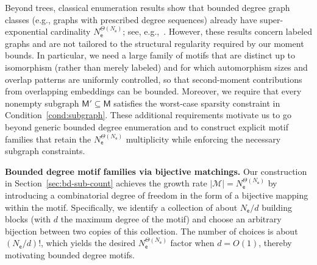 \documentclass[letterpaper,11pt]{article}
\theoremstyle{definition}
\newcommand{\maM}{\mathcal{M}}
\newcommand{\sfM}{{\mathsf{M}}}
\newcommand{\sfe}{{\mathsf{e}}}
\begin{document}

Beyond trees, classical enumeration results show that bounded degree graph classes (e.g., graphs with prescribed degree sequences) already have super-exponential cardinality $N_{\sfe}^{\Theta(N_{\sfe})}$; see, e.g.,~\cite{mckay1991asymptotic,liebenau2017asymptotic}. However, these results concern labeled graphs and are not tailored to the structural regularity required by our moment bounds. In particular, we need a large family of motifs that are  distinct up to isomorphism (rather than merely labeled) and for which automorphism sizes and overlap patterns are uniformly controlled, so that second-moment contributions from overlapping embeddings can be bounded. Moreover, we require that every nonempty subgraph $\sfM'\subseteq \sfM$ satisfies the worst-case sparsity constraint in Condition~\ref{cond:subgraph}. These additional requirements motivate us to go beyond generic bounded degree enumeration and to construct explicit motif families that retain the $N_{\sfe}^{\Theta(N_{\sfe})}$ multiplicity while enforcing the necessary subgraph constraints.


\noindent\textbf{Bounded degree motif families via bijective matchings.}
Our construction in Section~\ref{sec:bd-sub-count} achieves the growth rate $|\maM| = N_\sfe^{\Theta(N_\sfe)}$ by introducing a combinatorial degree of freedom in the form of a bijective mapping within the motif.
Specifically, we identify a collection of about $N_\sfe/d$ building blocks (with $d$ the maximum degree of the motif) and choose an arbitrary bijection between two copies of this collection.
The number of choices is about $(N_\sfe/d)!$, which yields the desired $N_\sfe^{\Theta(N_\sfe)}$ factor when $d=O(1)$, thereby motivating bounded degree motifs.
\end{document}
